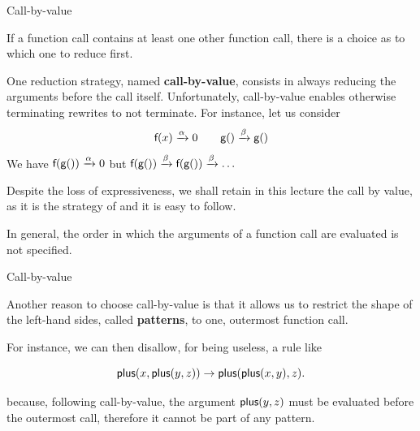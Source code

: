 %
\begin{frame}{Call-by-value}

  If a function call contains at least one other function call, there
  is a choice as to which one to reduce first.

  \bigskip

  One reduction strategy, named \textbf{call-by-value}, consists in
  always reducing the arguments before the call itself. Unfortunately,
  call-by-value enables otherwise terminating rewrites to not
  terminate. For instance, let us consider
  \begin{equation*}
    \textsf{f}(x) \xrightarrow{\alpha} 0\qquad
    \textsf{g}() \xrightarrow{\beta} \textsf{g}()
  \end{equation*}
  We have \(\textsf{f}(\textsf{g}()) \xrightarrow{\alpha} 0\) but
  \(\textsf{f}(\textsf{g}()) \xrightarrow{\beta} \textsf{f}(\textsf{g}())
  \xrightarrow{\beta} \dots\)

  \bigskip

  Despite the loss of expressiveness, we shall retain in this lecture
  the call by value, as it is the strategy of \OCaml and it is easy to
  follow.

  \bigskip

  In general, the order in which the arguments of a function call are
  evaluated is not specified.

\end{frame}

%
\begin{frame}{Call-by-value}

  Another reason to choose call-by-value is that it allows us to
  restrict the shape of the left\hyp{}hand sides, called
  \textbf{patterns}, to one, outermost function call.

  \bigskip

  For instance, we can then disallow, for being useless, a
  rule like

  \begin{equation*}
    \textsf{plus}(x,\textsf{plus}(y,z)) \rightarrow
    \textsf{plus}(\textsf{plus}(x,y),z).
  \end{equation*}

  \noindent because, following call\hyp{}by\hyp{}value, the argument
  \(\textsf{plus}(y,z)\) must be evaluated before the outermost call,
  therefore it cannot be part of any pattern.

\end{frame}

